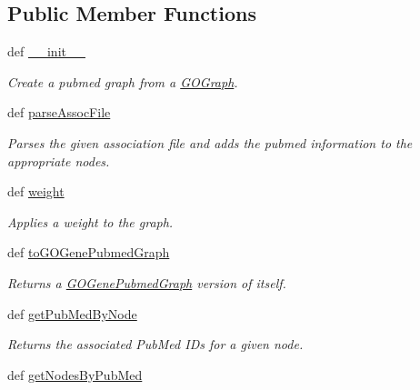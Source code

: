 \subsection*{Public Member Functions}
\begin{DoxyCompactItemize}
\item 
def \hyperlink{class_g_o_pubmed_graph_1_1_g_o_pubmed_graph_a67014838ca4e64ab6302e109cfb38baa}{\_\-\_\-init\_\-\_\-}
\begin{DoxyCompactList}\small\item\em Create a pubmed graph from a \hyperlink{namespace_g_o_graph}{GOGraph}. \item\end{DoxyCompactList}\item 
def \hyperlink{class_g_o_pubmed_graph_1_1_g_o_pubmed_graph_ae6b091d89d8aea816c9b87ca9bff96fb}{parseAssocFile}
\begin{DoxyCompactList}\small\item\em Parses the given association file and adds the pubmed information to the appropriate nodes. \item\end{DoxyCompactList}\item 
def \hyperlink{class_g_o_pubmed_graph_1_1_g_o_pubmed_graph_a1cd7af1343cfc3228db50e62ad1d79be}{weight}
\begin{DoxyCompactList}\small\item\em Applies a weight to the graph. \item\end{DoxyCompactList}\item 
def \hyperlink{class_g_o_pubmed_graph_1_1_g_o_pubmed_graph_a9c455a5443e6be4986d7bfbc1ef874c2}{toGOGenePubmedGraph}
\begin{DoxyCompactList}\small\item\em Returns a \hyperlink{namespace_g_o_gene_pubmed_graph}{GOGenePubmedGraph} version of itself. \item\end{DoxyCompactList}\item 
def \hyperlink{class_g_o_pubmed_graph_1_1_g_o_pubmed_graph_a24635a63eda34340ec00919adc165c7c}{getPubMedByNode}
\begin{DoxyCompactList}\small\item\em Returns the associated PubMed IDs for a given node. \item\end{DoxyCompactList}\item 
def \hyperlink{class_g_o_pubmed_graph_1_1_g_o_pubmed_graph_adc36d3c96e860a9db0dee1e60f0f9345}{getNodesByPubMed}

\end{DoxyCompactItemize}
